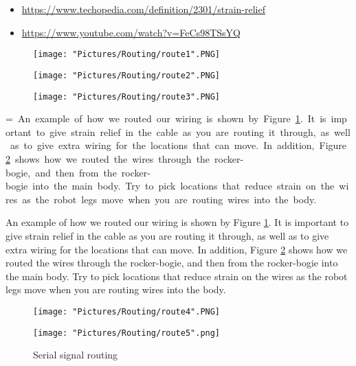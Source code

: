 \documentclass{article}
\makeatletter
\newcommand{\mybox}[1]{%
  \setbox0=\hbox{#1}%
  \setlength{\@tempdima}{\dimexpr\wd0+13pt}%
  \begin{tcolorbox}[colframe=mycolor,boxrule=0.5pt,arc=4pt,
      left=6pt,right=6pt,top=6pt,bottom=6pt,boxsep=0pt,width=0.95\textwidth]
    #1
  \end{tcolorbox}
}
\makeatother
\begin{document}
\begin{itemize}
	\item \href{https://www.techopedia.com/definition/2301/strain-relief}{https://www.techopedia.com/definition/2301/strain-relief}
	\item \href{https://www.youtube.com/watch?v=FeCs98TSsYQ}{https://www.youtube.com/watch?v=FeCs98TSsYQ}
\end{itemize}


\begin{figure}[H]
  	\centering
  	\begin{minipage}[b]{0.34\textwidth}
    		\texttt{[image: "Pictures/Routing/route1".PNG]}
  	\end{minipage}
  	\hfill
  	\begin{minipage}[b]{0.29\textwidth}
    		\texttt{[image: "Pictures/Routing/route2".PNG]}
  	\end{minipage}
    	\hfill
  	\begin{minipage}[b]{0.30\textwidth}
    		\texttt{[image: "Pictures/Routing/route3".PNG]}
  	\end{minipage}
  	\caption{}
	\label{wiring1}
\end{figure}


\mybox{
An example of how we routed our wiring is shown by Figure \ref{wiring1}. It is important to give strain relief in the cable as you are routing it through, as well as to give extra wiring for the locations that can move. In addition, Figure \ref{wiring2} shows how we routed the wires through the rocker-bogie, and then from the rocker-bogie into the main body. Try to pick locations that reduce strain on the wires as the robot legs move when you are routing wires into the body.
}

\begin{figure}[H]
 	\centering
  	\begin{minipage}[b]{0.48\textwidth}
		\texttt{[image: "Pictures/Routing/route4".PNG]}
  	\end{minipage}
  	\hfill
  	\begin{minipage}[b]{0.42\textwidth}
    		\texttt{[image: "Pictures/Routing/route5".png]}
  	\end{minipage}
	\caption{Serial signal routing}
	\label{wiring2}
\end{figure}
\end{document}

